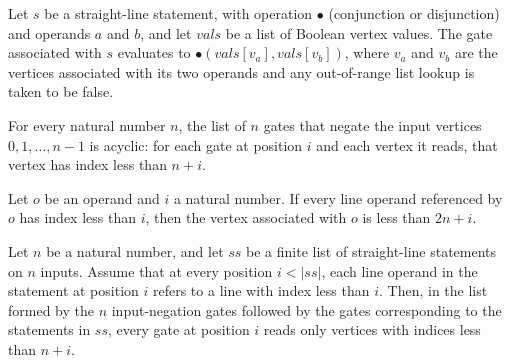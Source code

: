 \begin{theorem}
\label{BoolCircuit.SLStmt.toGate_eval}
\leanok
{}
Let $s$ be a straight-line statement, with operation $\bullet$ (conjunction or
disjunction) and operands $a$ and $b$, and let $vals$ be a list of Boolean vertex
values. The gate associated with $s$ evaluates to $\bullet(vals[v_a],vals[v_b])$, where
$v_a$ and $v_b$ are the vertices associated with its two operands and any out-of-range
list lookup is taken to be false.
\end{theorem}

\begin{theorem}
\label{BoolCircuit.StraightLine.negGates_acyclic}
\leanok
{}
For every natural number $n$, the list of $n$ gates that negate the input vertices
$0,1,\ldots,n-1$ is acyclic: for each gate at position $i$ and each vertex it reads,
that vertex has index less than $n+i$.
\end{theorem}

\begin{theorem}
\label{BoolCircuit.SLOperand.vertex_lt}
\leanok
{}
Let $o$ be an operand and $i$ a natural number. If every line operand referenced by $o$
has index less than $i$, then the vertex associated with $o$ is less than $2n+i$.
\end{theorem}

\begin{theorem}
\label{BoolCircuit.StraightLine.slpGates_acyclic}
\leanok
{}
Let $n$ be a natural number, and let $ss$ be a finite list of straight-line statements
on $n$ inputs. Assume that at every position $i<|ss|$, each line operand in the
statement at position $i$ refers to a line with index less than $i$. Then, in the list
formed by the $n$ input-negation gates followed by the gates corresponding to the
statements in $ss$, every gate at position $i$ reads only vertices with indices less
than $n+i$.
\end{theorem}

